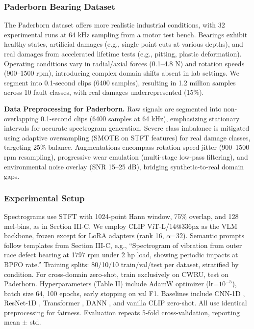 \subsubsection{Paderborn Bearing Dataset}
The Paderborn dataset \cite{paderborn2014} offers more realistic industrial conditions, with 32 experimental runs at 64 kHz sampling from a motor test bench. Bearings exhibit healthy states, artificial damages (e.g., single point cuts at various depths), and real damages from accelerated lifetime tests (e.g., pitting, plastic deformation). Operating conditions vary in radial/axial forces (0.1--4.8 N) and rotation speeds (900--1500 rpm), introducing complex domain shifts absent in lab settings. We segment into 0.1-second clips (6400 samples), resulting in 1.2 million samples across 10 fault classes, with real damages underrepresented (15\%).

\noindent\textbf{Data Preprocessing for Paderborn.} Raw signals are segmented into non-overlapping 0.1-second clips (6400 samples at 64 kHz), emphasizing stationary intervals for accurate spectrogram generation. Severe class imbalance is mitigated using adaptive oversampling (SMOTE on STFT features) for real damage classes, targeting 25\% balance. Augmentations encompass rotation speed jitter (900--1500 rpm resampling), progressive wear emulation (multi-stage low-pass filtering), and environmental noise overlay (SNR 15--25 dB), bridging synthetic-to-real domain gaps.

\subsubsection{Experimental Setup}
Spectrograms use STFT with 1024-point Hann window, 75\% overlap, and 128 mel-bins, as in Section III-C. We employ CLIP ViT-L/14@336px as the VLM backbone, frozen except for LoRA adapters (rank 16, $\alpha$=32). Semantic prompts follow templates from Section III-C, e.g., ``Spectrogram of vibration from outer race defect bearing at 1797 rpm under 2 hp load, showing periodic impacts at BPFO rate.'' Training splits: 80/10/10 train/val/test per dataset, stratified by condition. For cross-domain zero-shot, train exclusively on CWRU, test on Paderborn. Hyperparameters (Table II) include AdamW optimizer (lr=$10^{-5}$), batch size 64, 100 epochs, early stopping on val F1. Baselines include CNN-1D \cite{wen2019convolutional}, ResNet-1D \cite{he2016deep}, Transformer \cite{vaswani2017attention}, DANN \cite{ganin2016domain}, and vanilla CLIP zero-shot. All use identical preprocessing for fairness. Evaluation repeats 5-fold cross-validation, reporting mean $\pm$ std.

